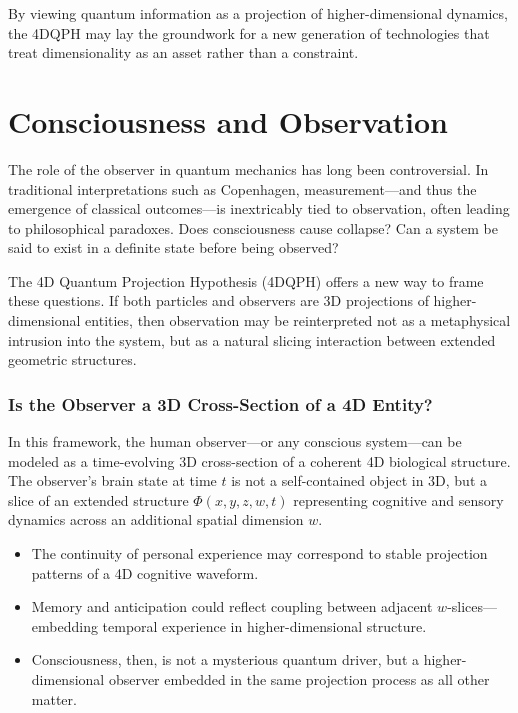 \documentclass[12pt]{article}
\begin{document}
By viewing quantum information as a projection of higher-dimensional dynamics, the 4DQPH may lay the groundwork for a new generation of technologies that treat dimensionality as an asset rather than a constraint.

\section{Consciousness and Observation}

The role of the observer in quantum mechanics has long been controversial. In traditional interpretations such as Copenhagen, measurement—and thus the emergence of classical outcomes—is inextricably tied to observation, often leading to philosophical paradoxes. Does consciousness cause collapse? Can a system be said to exist in a definite state before being observed?

The 4D Quantum Projection Hypothesis (4DQPH) offers a new way to frame these questions. If both particles and observers are 3D projections of higher-dimensional entities, then observation may be reinterpreted not as a metaphysical intrusion into the system, but as a natural slicing interaction between extended geometric structures.

\subsubsection*{Is the Observer a 3D Cross-Section of a 4D Entity?}

In this framework, the human observer—or any conscious system—can be modeled as a time-evolving 3D cross-section of a coherent 4D biological structure. The observer’s brain state at time \( t \) is not a self-contained object in 3D, but a slice of an extended structure \( \Phi(x, y, z, w, t) \) representing cognitive and sensory dynamics across an additional spatial dimension \( w \).

\begin{itemize}
    \item The continuity of personal experience may correspond to stable projection patterns of a 4D cognitive waveform.
    \item Memory and anticipation could reflect coupling between adjacent \( w \)-slices—embedding temporal experience in higher-dimensional structure.
    \item Consciousness, then, is not a mysterious quantum driver, but a higher-dimensional observer embedded in the same projection process as all other matter.
\end{itemize}
\end{document}
